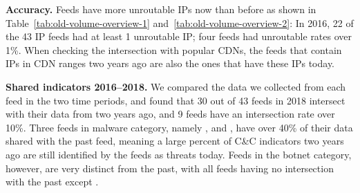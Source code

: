 \noindent\textbf{Accuracy.}
Feeds have more unroutable IPs now than before as shown in Table~\ref{tab:old-volume-overview-1} and~\ref{tab:old-volume-overview-2}:
In 2016, 22 of the 43 IP feeds had at least 1 unroutable IP; four feeds had unroutable rates over 1\%.
When checking the intersection with popular CDNs,
the feeds that contain IPs in CDN ranges two years ago are also the ones that have these IPs today.

\noindent\textbf{Shared indicators 2016--2018.}
We compared the data we collected from each feed in the two time periods, and found that 30
out of 43 feeds in 2018 intersect with their data from two years ago, and 9 feeds have
an intersection rate over 10\%. Three feeds in malware category, namely {\feedfeodo},
{\feedTSAbusech} and {\feedzeus}, have over 40\% of their data shared with the past feed,
meaning a large percent of C\&C indicators two years ago are still
identified by the feeds as threats today. Feeds in the botnet category, however, are very distinct from the
past, with all feeds having no intersection with the past except {\feedetiprep}.

